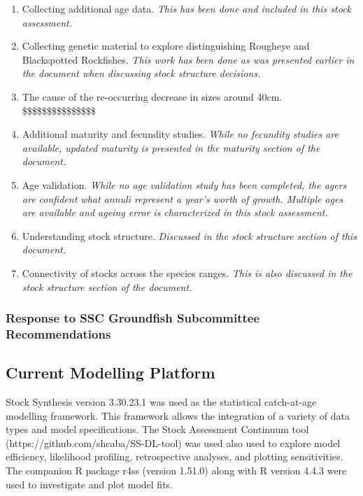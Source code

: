 \documentclass[
]{scrartcl}
\providecommand{\tightlist}{%
  \setlength{\itemsep}{0pt}\setlength{\parskip}{0pt}}\usepackage{longtable,booktabs,array}
\begin{document}
\begin{enumerate}
\def\labelenumi{\arabic{enumi}.}
\tightlist
\item
  Collecting additional age data. \emph{This has been done and included
  in this stock assessment.}
\item
  Collecting genetic material to explore distinguishing Rougheye and
  Blackspotted Rockfishes. \emph{This work has been done as was
  presented earlier in the document when discussing stock structure
  decisions.}
\item
  The cause of the re-occurring decrease in sizes around 40cm.
  \$\$\$\$\$\$\$\$\$\$\$\$\$\$\$
\item
  Additional maturity and fecundity studies. \emph{While no fecundity
  studies are available, updated maturity is presented in the maturity
  section of the document.}
\item
  Age validation. \emph{While no age validation study has been
  completed, the agers are confident what annuli represent a year's
  worth of growth. Multiple ages are available and ageing error is
  characterized in this stock assessment.}
\item
  Understanding stock structure. \emph{Discussed in the stock structure
  section of this document.}
\item
  Connectivity of stocks across the species ranges. \emph{This is also
  discussed in the stock structure section of the document.}
\end{enumerate}

\subsubsection{Response to SSC Groundfish Subcommittee
Recommendations}\label{response-to-ssc-groundfish-subcommittee-recommendations}

\subsection{Current Modelling
Platform}\label{current-modelling-platform}

Stock Synthesis version 3.30.23.1 was used as the statistical
catch-at-age modelling framework. This framework allows the integration
of a variety of data types and model specifications. The Stock
Assessment Continuum tool (https://github.com/shcaba/SS-DL-tool) was
used also used to explore model efficiency, likelihood profiling,
retrospective analyses, and plotting sensitivities. The companion R
package r4ss (version 1.51.0) along with R version 4.4.3 were used to
investigate and plot model fits.
\end{document}

